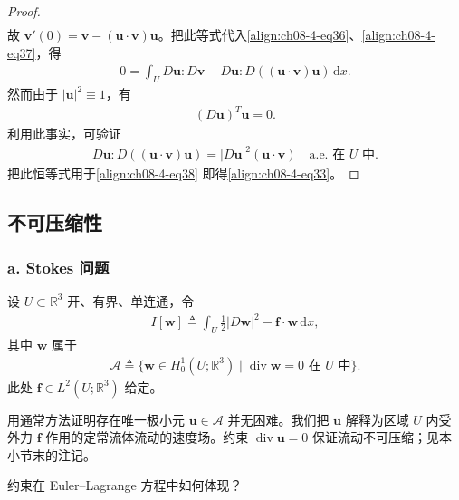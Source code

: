 \documentclass[../../main.tex]{subfiles}
\begin{document}
\begin{theorem}
\begin{proof}
\begin{align*}
\end{align*}
故 $\mathbf{v}'(0)=\mathbf{v}-(\mathbf{u}\cdot\mathbf{v})\mathbf{u}$。把此等式代入\eqref{align:ch08-4-eq36}、\eqref{align:ch08-4-eq37}，得
\begin{align}
0=\int_U D\mathbf{u}:D\mathbf{v}-D\mathbf{u}:D((\mathbf{u}\cdot\mathbf{v})\mathbf{u})\,\mathrm{d}x.\label{align:ch08-4-eq38}
\end{align}
然而由于 $|\mathbf{u}|^2\equiv 1$，有
\begin{align*}
(D\mathbf{u})^T\mathbf{u}=0.
\end{align*}
利用此事实，可验证
\begin{align*}
D\mathbf{u}:D((\mathbf{u}\cdot\mathbf{v})\mathbf{u})=|D\mathbf{u}|^2(\mathbf{u}\cdot\mathbf{v})\quad\text{a.e. 在 }U\text{ 中}.
\end{align*}
把此恒等式用于\eqref{align:ch08-4-eq38} 即得\eqref{align:ch08-4-eq33}。
\end{proof}
\end{theorem}

\subsection{不可压缩性}\label{subsection:ch08-4-4-不可压缩性}

\subsubsection*{a. Stokes 问题}

设 $U\subset\mathbb{R}^3$ 开、有界、单连通，令
\begin{align*}
I[\mathbf{w}]\triangleq\int_U\frac12|D\mathbf{w}|^2-\mathbf{f}\cdot\mathbf{w}\,\mathrm{d}x,
\end{align*}
其中 $\mathbf{w}$ 属于
\begin{align*}
\mathcal{A}\triangleq\{\mathbf{w}\in H_0^1(U;\mathbb{R}^3)\mid \operatorname{div}\mathbf{w}=0\text{ 在 }U\text{ 中}\}.
\end{align*}
此处 $\mathbf{f}\in L^2(U;\mathbb{R}^3)$ 给定。

用通常方法证明存在唯一极小元 $\mathbf{u}\in\mathcal{A}$ 并无困难。我们把 $\mathbf{u}$ 解释为区域 $U$ 内受外力 $\mathbf{f}$ 作用的定常流体流动的速度场。约束 $\operatorname{div}\mathbf{u}=0$ 保证流动不可压缩；见本小节末的注记。

约束在 Euler--Lagrange 方程中如何体现？
\end{document}
